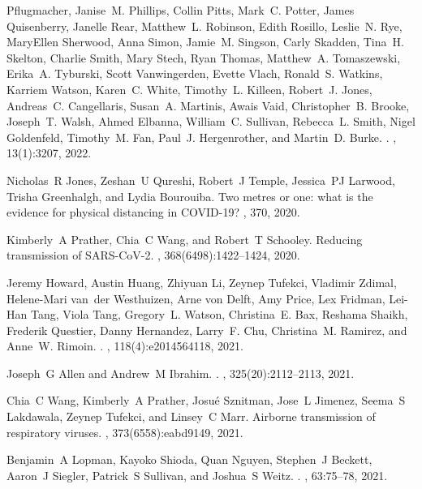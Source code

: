 \documentclass[12pt]{article}
\begin{document}
\begin{thebibliography}{10}
  Pflugmacher, Janise~M. Phillips, Collin Pitts, Mark~C. Potter, James
  Quisenberry, Janelle Rear, Matthew~L. Robinson, Edith Rosillo, Leslie~N. Rye,
  MaryEllen Sherwood, Anna Simon, Jamie~M. Singson, Carly Skadden, Tina~H.
  Skelton, Charlie Smith, Mary Stech, Ryan Thomas, Matthew~A. Tomaszewski,
  Erika~A. Tyburski, Scott Vanwingerden, Evette Vlach, Ronald~S. Watkins,
  Karriem Watson, Karen~C. White, Timothy~L. Killeen, Robert~J. Jones,
  Andreas~C. Cangellaris, Susan~A. Martinis, Awais Vaid, Christopher~B. Brooke,
  Joseph~T. Walsh, Ahmed Elbanna, William~C. Sullivan, Rebecca~L. Smith, Nigel
  Goldenfeld, Timothy~M. Fan, Paul~J. Hergenrother, and Martin~D. Burke.
.
, 13(1):3207, 2022.

Nicholas~R Jones, Zeshan~U Qureshi, Robert~J Temple, Jessica~PJ Larwood, Trisha
  Greenhalgh, and Lydia Bourouiba.
\newblock Two metres or one: what is the evidence for physical distancing in
  {COVID-19?}
, 370, 2020.

Kimberly~A Prather, Chia~C Wang, and Robert~T Schooley.
\newblock Reducing transmission of {SARS-CoV-2}.
, 368(6498):1422--1424, 2020.

Jeremy Howard, Austin Huang, Zhiyuan Li, Zeynep Tufekci, Vladimir Zdimal,
  Helene-Mari van~der Westhuizen, Arne von Delft, Amy Price, Lex Fridman,
  Lei-Han Tang, Viola Tang, Gregory~L. Watson, Christina~E. Bax, Reshama
  Shaikh, Frederik Questier, Danny Hernandez, Larry~F. Chu, Christina~M.
  Ramirez, and Anne~W. Rimoin.
.
,
  118(4):e2014564118, 2021.

Joseph~G Allen and Andrew~M Ibrahim.
.
, 325(20):2112--2113, 2021.

Chia~C Wang, Kimberly~A Prather, Josu{\'e} Sznitman, Jose~L Jimenez, Seema~S
  Lakdawala, Zeynep Tufekci, and Linsey~C Marr.
\newblock Airborne transmission of respiratory viruses.
, 373(6558):eabd9149, 2021.

Benjamin~A Lopman, Kayoko Shioda, Quan Nguyen, Stephen~J Beckett, Aaron~J
  Siegler, Patrick~S Sullivan, and Joshua~S Weitz.
.
, 63:75--78, 2021.


\end{thebibliography}
\end{document}

